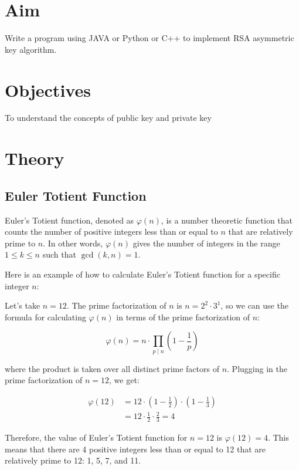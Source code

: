 \documentclass[11pt]{article}
\begin{document}
\tableofcontents
\thispagestyle{empty}
\clearpage

\setcounter{page}{1}

\section{Aim}
Write a program using JAVA or Python or C++ to implement RSA asymmetric key
algorithm.

\section{Objectives}
To understand the concepts of public key and private key

\section{Theory}

\subsection{Euler Totient Function}
Euler's Totient function, denoted as $\varphi(n)$, is a number theoretic function that counts the number of positive integers less than or equal to $n$ that are relatively prime to $n$. In other words, $\varphi(n)$ gives the number of integers in the range $1 \leq k \leq n$ such that $\gcd(k, n) = 1$.

Here is an example of how to calculate Euler's Totient function for a specific integer $n$:

Let's take $n = 12$. The prime factorization of $n$ is $n = 2^2 \cdot 3^1$, so we can use the formula for calculating $\varphi(n)$ in terms of the prime factorization of $n$:

$$\varphi(n) = n \cdot \prod_{p \mid n} \left(1 - \frac{1}{p}\right)$$

where the product is taken over all distinct prime factors of $n$. Plugging in the prime factorization of $n = 12$, we get:

\begin{align*}
\varphi(12) &= 12 \cdot \left(1 - \frac{1}{2}\right) \cdot \left(1 - \frac{1}{3}\right) \\
&= 12 \cdot \frac{1}{2} \cdot \frac{2}{3} = 4
\end{align*}

Therefore, the value of Euler's Totient function for $n = 12$ is $\varphi(12) = 4$. This means that there are 4 positive integers less than or equal to 12 that are relatively prime to 12: 1, 5, 7, and 11.
\end{document}

